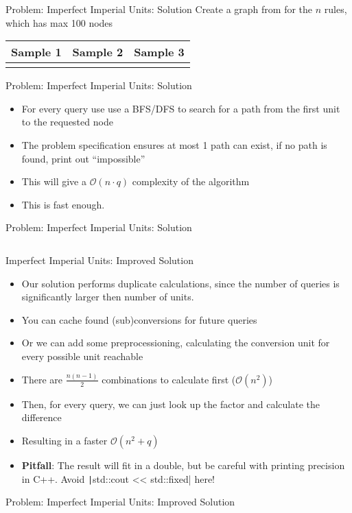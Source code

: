 \documentclass[11pt,pdf, aspectratio=169]{beamer}
\begin{document}
  \begin{frame}{Problem: Imperfect Imperial Units: Solution}
    Create a graph from for the $n$ rules, which has max 100 nodes


    \begin{tabular}{c|c|c}
      Sample 1               & Sample 2               & Sample 3               \\
      \hline
       &  &  \\
    \end{tabular}
  \end{frame}

  \begin{frame}{Problem: Imperfect Imperial Units: Solution}
    \begin{itemize}
      \item For every query use use a BFS/DFS to search for a path from the first unit to the requested node
      \item The problem specification ensures at most 1 path can exist, if no path is found, print out ``impossible''
      \item This will give a $\mathcal{O}(n\cdot q)$ complexity of the algorithm
      \item This is fast enough.
    \end{itemize}
  \end{frame}
  \begin{frame}[containsverbatim]{ Problem: Imperfect Imperial Units: Solution}
    \inputminted[fontsize=\tiny]{python}{code/session-1/python/bapc-i-search.py}
  \end{frame}
  \begin{frame}{Imperfect Imperial Units: Improved Solution}
    \begin{itemize}
      \item<1-> Our solution performs duplicate calculations, since the number of queries is significantly larger then number of units.
      \item<2-> You can cache found (sub)conversions for future queries
      \item<3-> Or we can add some preprocessioning, calculating the conversion unit for every possible unit reachable
      \item<3-> There are $\frac{n(n-1)}{2}$ combinations to calculate first ($\mathcal{O}(n^2)$)
      \item<3-> Then, for every query, we can just look up the factor and calculate the difference
      \item<4-> Resulting in a faster $\mathcal{O}(n^2 + q)$
      \item<5-> \textbf{Pitfall}: The result will fit in a double, but be careful with printing precision in C++. Avoid \texttt|std::cout << std::fixed| here!
    \end{itemize}
  \end{frame}
  \begin{frame}[containsverbatim]{ Problem: Imperfect Imperial Units: Improved Solution}
    \inputminted[fontsize=\tiny]{python}{code/session-1/python/bapc-i-cache.py}
  \end{frame}
\end{document}
